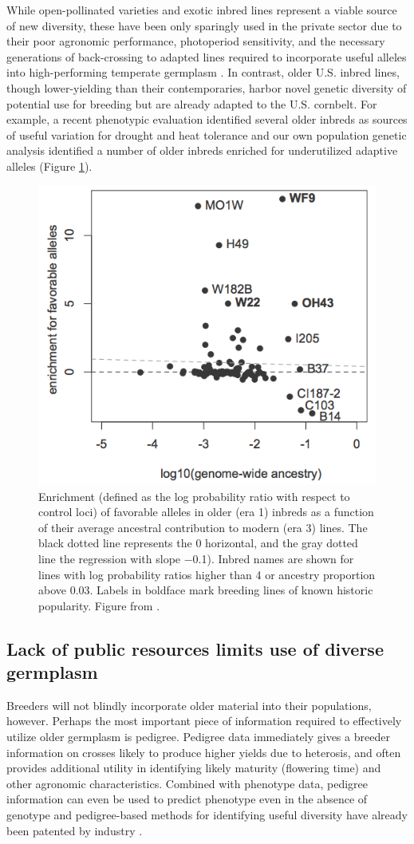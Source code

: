 \documentclass[12pt]{article}
\begin{document}
While open-pollinated varieties and exotic inbred lines represent a viable source of new diversity, these have been only sparingly used in the private sector due to their poor agronomic performance, photoperiod sensitivity, and the necessary generations of back-crossing to adapted lines required to incorporate useful alleles into high-performing temperate germplasm \citep{goodman1999broadening}.
In contrast, older U.S. inbred lines, though lower-yielding than their contemporaries, harbor novel genetic diversity of potential use for breeding but are already adapted to the U.S. cornbelt.  
For example, a recent phenotypic evaluation identified several older inbreds as sources of useful variation for drought and heat tolerance \citep{chen2012characterization} and our own population genetic analysis identified a number of older inbreds enriched for underutilized adaptive alleles (Figure \ref{fig:wf9}).

\begin{figure}
\includegraphics[width=0.5\linewidth]{joost_wf9.png}
\caption{Enrichment (defined as the log probability ratio with respect to control loci) of favorable alleles in older (era 1) inbreds as a function of their average ancestral contribution to modern (era 3) lines. The black dotted line represents the 0 horizontal, and the gray dotted line the regression  with slope −0.1). Inbred names are shown for lines with log probability ratios higher than 4 or ancestry proportion above 0.03. Labels in boldface mark breeding lines of known historic popularity. Figure from \citet{van2012historical}.} 
\label{fig:wf9}
\end{figure}

\subsection*{Lack of public resources limits use of diverse germplasm}

Breeders will not blindly incorporate older material into their populations, however.  
Perhaps the most important piece of information required to effectively utilize older germplasm is pedigree.
Pedigree data immediately gives a breeder information on crosses likely to produce higher yields due to heterosis, and often provides additional utility in identifying likely maturity (flowering time) and other agronomic characteristics. 
Combined with phenotype data, pedigree information can even be used to predict phenotype even in the absence of genotype \citep{piepho2008blup} and pedigree-based methods for identifying useful diversity have already been patented by industry \citep{sebastian1995method}.
\end{document}
